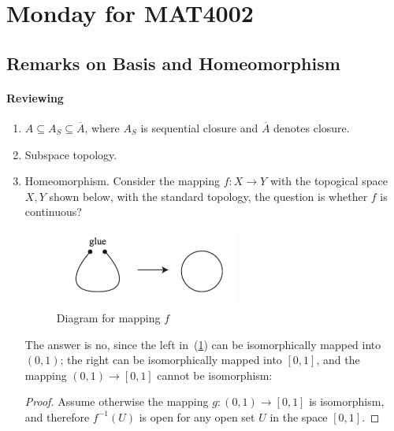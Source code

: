 \section{Monday for MAT4002}
\subsection{Remarks on Basis and Homeomorphism}

\paragraph{Reviewing}
\begin{enumerate}
\item
$A\subseteq A_S\subseteq\overline{A}$, where $A_S$ is sequential closure and $\overline{A}$ denotes closure.
\item
Subspace topology.
\item
Homeomorphism.
Consider the mapping $f:X\to Y$ with the topogical space $X,Y$ shown below, with the standard topology, the question is whether $f$ is continuous?
\begin{figure}[H]
\centering
\includegraphics[width=6cm]{week3/p_1}
\caption{Diagram for mapping $f$}
\label{fig:3:1}
\end{figure}
The answer is no, since the left in~(\ref{fig:3:1}) can be isomorphically mapped into $(0,1)$; the right can be isomorphically mapped into $[0,1]$, and the mapping $(0,1)\to[0,1]$ cannot be isomorphism:
\begin{proof}
Assume otherwise the mapping $g:(0,1)\to[0,1]$ is isomorphism, and therefore $f^{-1}(U)$ is open for any open set $U$ in the space $[0,1]$.


\end{proof}
\end{enumerate}
